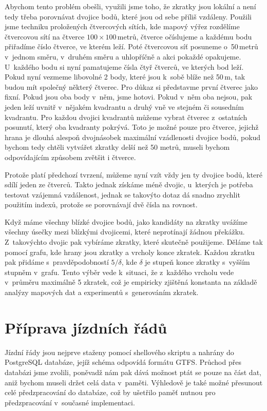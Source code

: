 Abychom tento problém obešli, využili jsme toho, že zkratky jsou lokální a není
tedy třeba porovnávat dvojice bodů, které jsou od sebe příliš vzdáleny. Použili
jsme techniku proložených čtvercových sítích, kde mapový výřez rozdělíme
čtvercovou sítí na čtverce $100\times100$\,metrů, čtverce očíslujeme a každému
bodu přiřadíme číslo čtverce, ve kterém leží. Poté čtvercovou síť posuneme
o~50\,metrů v~jednom směru, v~druhém směru a uhlopříčně a akci pokaždé opakujeme.
U~každého bodu si nyní pamatujeme čísla čtyř čtverců, ve kterých bod leží. 
Pokud nyní vezmeme libovolné 2 body, které jsou k~sobě blíže než 50\,m, tak
budou mít společný některý čtverec. Pro důkaz si představme první čtverec jako
fixní. Pokud jsou oba body v~něm, jsme hotovi. Pokud v~něm oba nejsou, pak jeden
leží uvnitř v~nějakém kvadrantu a druhý vně ve stejném či sousedním kvadrantu.
Pro každou dvojici kvadrantů můžeme vybrat čtverec z~ostatních posunutí, který
oba kvadranty pokrývá. Toto je možné pouze pro čtverce, jejichž hrana je dlouhá
alespoň dvojnásobek maximální vzádlenosti dvojice bodů, pokud bychom tedy chtěli
vytvářet zkratky delší než 50 metrů, museli bychom odpovídajícím způsobem
zvětšit i čtverce.

Protože platí předchozí tvrzení, můžeme nyní vzít vždy jen ty dvojice bodů,
které sdílí jeden ze čtverců. Takto jednak získáme méně dvojic, u~kterých je
potřeba testovat vzájemná vzdálenost, jednak se takovýto dotaz dá snadno
zrychlit použitím indexů, protože se porovnávají dvě čísla na rovnost. 

Když máme všechny blízké dvojice bodů, jako kandidáty na zkratky uvážíme
všechny úsečky mezi blízkými dvojicemi, které neprotínají žádnou překážku.
Z~takovýchto dvojic pak vybíráme zkratky, které skutečně použijeme. Děláme
tak pomocí grafu, kde hrany jsou zkratky a vrcholy konce zkratek. Každou zkratku
pak přidáme s~pravděpodobností $5/\delta$, kde $\delta$ je stupeň konce
zkratky s~vyšším stupněm v~grafu. Tento výběr vede k~situaci, že z~každého
vrcholu vede v~průměru maximálně 5 zkratek, což je empiricky zjištěná konstanta
na základě analýzy mapových dat a experimentů s~generováním zkratek.

\section{Příprava jízdních řádů}
\label{ch:implementace:GTFS}
Jízdní řády jsou nejprve staženy pomocí shellového skriptu a nahrány do
PostgreSQL databáze, jejíž schéma odpovídá formátu GTFS. Průchod přes databázi
jsme zvolili, poněvadž nám pak dává možnost ptát se pouze na část dat,
aniž bychom museli držet celá data v~paměti. Výhledově je také možné přesunout
celé předzpracování do databáze, což by ušetřilo paměť nutnou pro předzpracování
v~současné implementaci.

